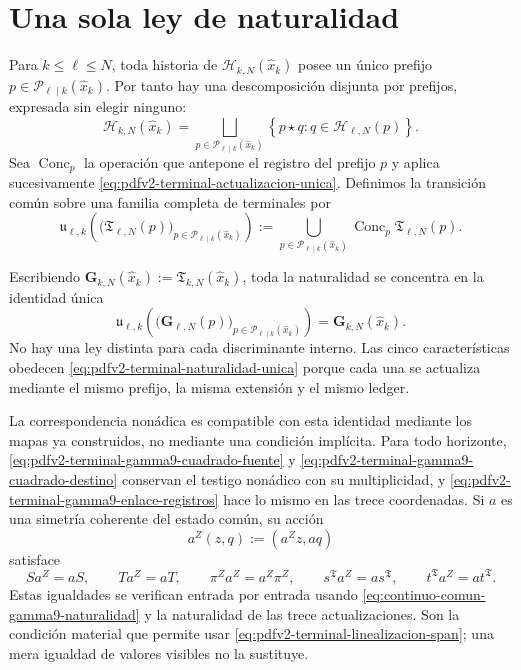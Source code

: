 \section{Una sola ley de naturalidad}

Para \(k\leq\ell\leq N\), toda historia de
\(\mathscr H_{k,N}(\widehat x_k)\) posee un \'unico prefijo
\(p\in\mathscr P_{\ell\mid k}(\widehat x_k)\). Por tanto hay una descomposici\'on
disjunta por prefijos, expresada sin elegir ninguno:
\begin{equation}
\label{eq:pdfv2-terminal-particion-historias}
 \mathscr H_{k,N}(\widehat x_k)
 =\bigsqcup_{p\in\mathscr P_{\ell\mid k}(\widehat x_k)}
 \left\{p\star q:q\in\mathscr H_{\ell,N}(p)\right\}.
\end{equation}
Sea \(\operatorname{Conc}_p\) la operaci\'on que antepone el registro del
prefijo \(p\) y aplica sucesivamente
\eqref{eq:pdfv2-terminal-actualizacion-unica}. Definimos la transici\'on
com\'un sobre una familia completa de terminales por
\begin{equation}
\label{eq:pdfv2-terminal-transicion-comun}
 \mathfrak u_{\ell,k}
 \left(
   \bigl(\mathfrak T_{\ell,N}(p)\bigr)_{p\in\mathscr P_{\ell\mid k}(\widehat x_k)}
 \right)
 :=\bigcup_{p\in\mathscr P_{\ell\mid k}(\widehat x_k)}
   \operatorname{Conc}_p\mathfrak T_{\ell,N}(p).
\end{equation}

Escribiendo
\(\mathbf G_{k,N}(\widehat x_k):=\mathfrak T_{k,N}(\widehat x_k)\), toda la naturalidad se
concentra en la identidad \'unica
\begin{equation}
\label{eq:pdfv2-terminal-naturalidad-unica}
 \boxed{
 \mathfrak u_{\ell,k}
 \left(
   \bigl(\mathbf G_{\ell,N}(p)\bigr)_{p\in\mathscr P_{\ell\mid k}(\widehat x_k)}
 \right)
 =\mathbf G_{k,N}(\widehat x_k).}
\end{equation}
No hay una ley distinta para cada discriminante interno. Las cinco
caracter\'isticas obedecen
\eqref{eq:pdfv2-terminal-naturalidad-unica} porque cada una se actualiza
mediante el mismo prefijo, la misma extensi\'on y el mismo ledger.

La correspondencia non\'adica es compatible con esta identidad mediante los
mapas ya construidos, no mediante una condici\'on impl\'icita. Para todo
horizonte, \eqref{eq:pdfv2-terminal-gamma9-cuadrado-fuente} y
\eqref{eq:pdfv2-terminal-gamma9-cuadrado-destino} conservan el testigo
non\'adico con su multiplicidad, y
\eqref{eq:pdfv2-terminal-gamma9-enlace-registros} hace lo mismo en las
trece coordenadas. Si \(a\) es una simetr\'ia coherente del estado
com\'un, su acci\'on
\[
 a^Z(z,q):=(a^Zz,aq)
\]
satisface
\begin{equation}
\label{eq:pdfv2-terminal-gamma9-equivarianza-completa}
 S a^Z=aS,\qquad T a^Z=aT,\qquad
 \pi^Za^Z=a^Z\pi^Z,\qquad
 s^{\mathfrak T}a^Z=as^{\mathfrak T},\qquad
 t^{\mathfrak T}a^Z=at^{\mathfrak T}.
\end{equation}
Estas igualdades se verifican entrada por entrada usando
\eqref{eq:continuo-comun-gamma9-naturalidad} y la naturalidad de las trece
actualizaciones. Son la condici\'on material que permite usar
\eqref{eq:pdfv2-terminal-linealizacion-span}; una mera igualdad de valores
visibles no la sustituye.

